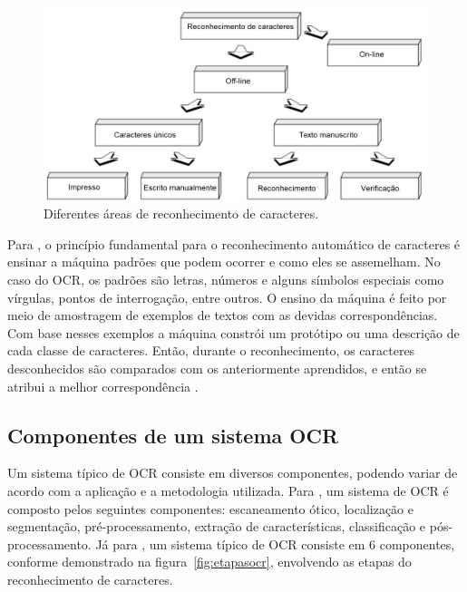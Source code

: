  \begin{figure}[h]
	\centering
	\includegraphics[width=1.0\textwidth]{Imagens/areasocr.jpeg} 
	\caption[Diferentes áreas de reconhecimento de caracteres.]{Diferentes áreas de reconhecimento de caracteres.}
	\label{fig:areaocr}
\end{figure}

Para , o princípio fundamental para o reconhecimento
automático de caracteres é ensinar a máquina padrões que podem ocorrer e como eles se assemelham. No caso do OCR, os padrões são letras, números e alguns símbolos especiais como vírgulas, pontos de interrogação, entre outros. O ensino da máquina é feito por meio de amostragem de exemplos de textos com as devidas correspondências.
Com base nesses exemplos a máquina constrói um protótipo ou uma
descrição de cada classe de caracteres. Então, durante o reconhecimento, os caracteres desconhecidos são comparados com os anteriormente aprendidos, e então se atribui a melhor correspondência \cite{Eikvil1993}.


\subsection{Componentes de um sistema OCR}
Um sistema típico de OCR consiste em diversos componentes, podendo variar de
acordo com a aplicação e a metodologia utilizada. 
Para , um sistema de OCR é composto pelos seguintes componentes: escaneamento ótico, localização e segmentação, pré-processamento, extração de características, classificação e pós-processamento. Já para , um sistema típico de OCR consiste em 6 componentes, conforme demonstrado na figura~\ref{fig:etapasocr}, envolvendo as etapas do reconhecimento de caracteres.



